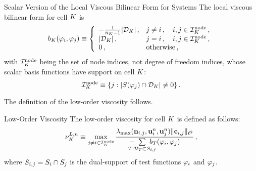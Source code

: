 \begin{definition}{Scalar Version of the Local Viscous Bilinear Form for Systems}
   The local viscous bilinear form for cell $K$ is
   \begin{equation}\label{eq:bilinearform_system}
     b_{K}(\varphi_i,\varphi_j)
       \equiv \left\{\begin{array}{l l}
         -\frac{1}{\bar{n}_K - 1}|\mathcal{D}_K|\,, & j\ne i\,,
       \quad i,j\in \mathcal{I}^{\text{node}}_K\,, \\
       |\mathcal{D}_K|\,, & j = i \,, \quad i,j\in \mathcal{I}^{\text{node}}_K\,, \\
       0          \,, & \mbox{otherwise}\,,
     \end{array}\right.
   \end{equation}
   with $\mathcal{I}^{\text{node}}_K$ being the set of node indices, not degree of
   freedom indices, whose scalar basis functions have support on cell $K$:
   \begin{equation}
     \mathcal{I}^{\text{node}}_K \equiv \{ j :
       |S(\varphi_j)\cap \mathcal{D}_K|\ne 0\}
     \,.
   \end{equation}
\end{definition}
The definition of the low-order viscosity follows.
\begin{definition}{Low-Order Viscosity}
   The low-order viscosity for cell $K$ is defined as follows:
   \begin{equation}
     \lowordercellviscosity[\timeindex] \equiv
       \max\limits_{j\ne i\in\indicesnode}
         \frac{\maxwavespeed(\normalvector_{i,j},\vectorsolution^\timeindex_i,
           \vectorsolution^\timeindex_j)\|\gradiententry\|_{\ell^2}}
         {-\mkern-20mu\sumKSij[T]\mkern-20mu\localviscbilinearform{T}{i}{j}}
     \eqc
   \end{equation}
   where $S_{i,j}=S_i\cap S_j$ is the dual-support of test
   functions $\varphi_i$ and $\varphi_j$.
\end{definition}
